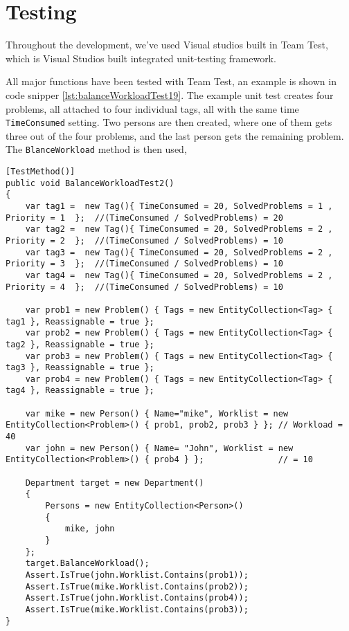 \chapter{Testing}
\label{chap:testing}

Throughout the development, we've used Visual studios built in Team Test, which is Visual Studios built integrated unit-testing framework. \cite{teamtest}

All major functions have been tested with Team Test, an example is shown in code snipper \ref{lst:balanceWorkloadTest19}. The example unit test creates four problems, all attached to four individual tags, all with the same time \verb+TimeConsumed+ setting. Two persons are then created, where one of them gets three out of the four problems, and the last person gets the remaining problem. The \verb+BlanceWorkload+ method is then used,  


\begin{lstlisting}[style=sourceCode, caption=\myCaption{An example unit test which tests a specific instance of the balanceWorkload method.}, label=lst:balanceWorkloadTest19]
[TestMethod()]
public void BalanceWorkloadTest2()
{
    var tag1 =  new Tag(){ TimeConsumed = 20, SolvedProblems = 1 , Priority = 1  };  //(TimeConsumed / SolvedProblems) = 20
    var tag2 =  new Tag(){ TimeConsumed = 20, SolvedProblems = 2 , Priority = 2  };  //(TimeConsumed / SolvedProblems) = 10
    var tag3 =  new Tag(){ TimeConsumed = 20, SolvedProblems = 2 , Priority = 3  };  //(TimeConsumed / SolvedProblems) = 10
    var tag4 =  new Tag(){ TimeConsumed = 20, SolvedProblems = 2 , Priority = 4  };  //(TimeConsumed / SolvedProblems) = 10

    var prob1 = new Problem() { Tags = new EntityCollection<Tag> { tag1 }, Reassignable = true };
    var prob2 = new Problem() { Tags = new EntityCollection<Tag> { tag2 }, Reassignable = true };
    var prob3 = new Problem() { Tags = new EntityCollection<Tag> { tag3 }, Reassignable = true };
    var prob4 = new Problem() { Tags = new EntityCollection<Tag> { tag4 }, Reassignable = true };
   
    var mike = new Person() { Name="mike", Worklist = new EntityCollection<Problem>() { prob1, prob2, prob3 } }; // Workload = 40
    var john = new Person() { Name= "John", Worklist = new EntityCollection<Problem>() { prob4 } };               // = 10

    Department target = new Department()
    {
        Persons = new EntityCollection<Person>()
        {
            mike, john
        }
    };
    target.BalanceWorkload();
    Assert.IsTrue(john.Worklist.Contains(prob1));
    Assert.IsTrue(mike.Worklist.Contains(prob2));
    Assert.IsTrue(john.Worklist.Contains(prob4));
    Assert.IsTrue(mike.Worklist.Contains(prob3));
}
\end{lstlisting}

